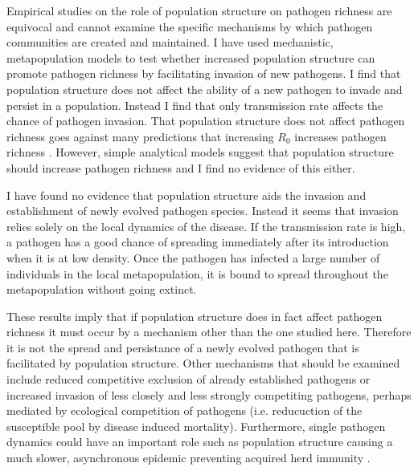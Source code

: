 
Empirical studies on the role of population structure on pathogen richness are equivocal and cannot examine the specific mechanisms by which pathogen communities are created and maintained.
I have used mechanistic, metapopulation models to test whether increased population structure can promote pathogen richness by facilitating invasion of new pathogens.
I find that population structure does not affect the ability of a new pathogen to invade and persist in a population.
Instead I find that only transmission rate affects the chance of pathogen invasion.
That population structure does not affect pathogen richness goes against many predictions that increasing $R_0$ increases pathogen richness \cite{nunn2003comparative, morand2000wormy, poulin2014parasite, poulin2000diversity, altizer2003social}.
However, simple analytical models suggest that population structure should increase pathogen richness \cite{qiu2013vector, allen2004sis, nunes2006localized} and I find no evidence of this either.

I have found no evidence that population structure aids the invasion and establishment of newly evolved pathogen species.
Instead it seems that invasion relies solely on the local dynamics of the disease.
If the transmission rate is high, a pathogen has a good chance of spreading immediately after its introduction when it is at low density.
Once the pathogen has infected a large number of individuals in the local metapopulation, it is bound to spread throughout the metapopulation without going extinct.


These results imply that if population structure does in fact affect pathogen richness \cite{maganga2014bat, turmelle2009correlates, gay2014parasite} it must occur by a mechanism other than the one studied here.
Therefore it is not the spread and persistance of a newly evolved pathogen that is facilitated by population structure.
Other mechanisms that should be examined include reduced competitive exclusion of already established pathogens or increased invasion of less closely and less strongly competiting pathogens, perhaps mediated by ecological competition of pathogens (i.e. reducuction of the susceptible pool by disease induced mortality).
Furthermore, single pathogen dynamics could have an important role such as population structure causing a much slower, asynchronous epidemic preventing acquired herd immunity \cite{plowright2011urban}.

